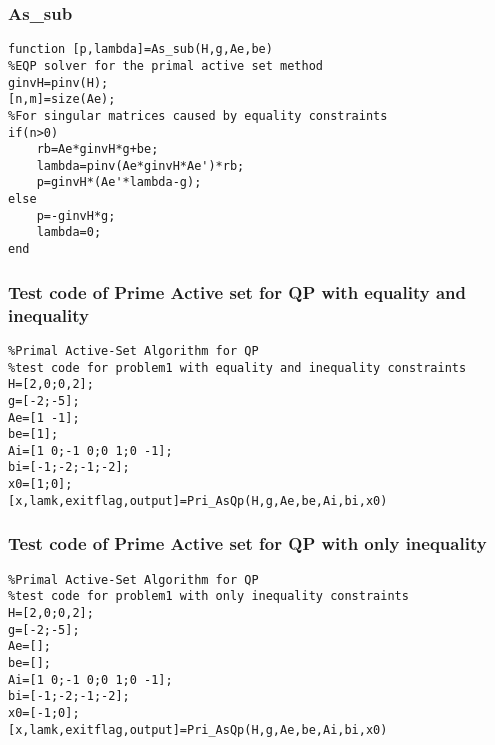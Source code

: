 \subsubsection{\bfseries As_sub }
\label{6.2.3}
{\setmainfont{Courier New Bold} \scriptsize         
\begin{lstlisting}
function [p,lambda]=As_sub(H,g,Ae,be)
%EQP solver for the primal active set method
ginvH=pinv(H);
[n,m]=size(Ae);
%For singular matrices caused by equality constraints
if(n>0)
    rb=Ae*ginvH*g+be;
    lambda=pinv(Ae*ginvH*Ae')*rb;
    p=ginvH*(Ae'*lambda-g);
else
    p=-ginvH*g;
    lambda=0;
end
\end{lstlisting}}
\subsubsection{\bfseries Test code of Prime Active set for QP with equality and inequality}
\label{6.2.4}
{\setmainfont{Courier New Bold} \scriptsize         
\begin{lstlisting}
%Primal Active-Set Algorithm for QP 
%test code for problem1 with equality and inequality constraints
H=[2,0;0,2];
g=[-2;-5];
Ae=[1 -1];
be=[1];
Ai=[1 0;-1 0;0 1;0 -1];
bi=[-1;-2;-1;-2];
x0=[1;0];
[x,lamk,exitflag,output]=Pri_AsQp(H,g,Ae,be,Ai,bi,x0)
\end{lstlisting}}
\subsubsection{\bfseries Test code of Prime Active set for QP with only inequality}
\label{6.2.5}
{\setmainfont{Courier New Bold} \scriptsize         
\begin{lstlisting}
%Primal Active-Set Algorithm for QP 
%test code for problem1 with only inequality constraints
H=[2,0;0,2];
g=[-2;-5];
Ae=[];
be=[];
Ai=[1 0;-1 0;0 1;0 -1];
bi=[-1;-2;-1;-2];
x0=[-1;0];
[x,lamk,exitflag,output]=Pri_AsQp(H,g,Ae,be,Ai,bi,x0)
\end{lstlisting}}
